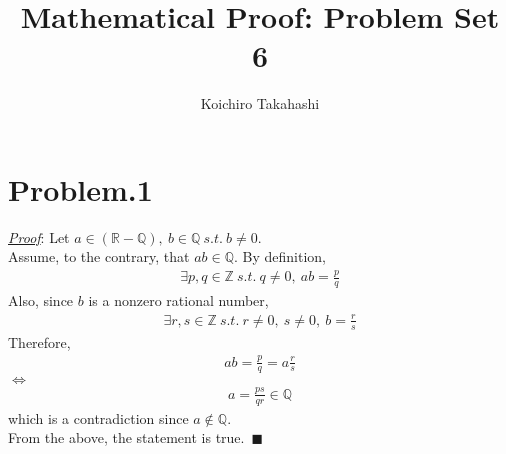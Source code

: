 \documentclass[12pt]{article}
\begin{document}
\title{Mathematical Proof: Problem Set 6}
\author{Koichiro Takahashi}
\maketitle 

\section*{Problem.1}
\underline{\textit{Proof}}: Let $a \in \mathbb{(R-Q)},~ b \in \mathbb{Q} ~s.t.~ b \neq 0$.\\[1em]
Assume, to the contrary, that $ab \in \mathbb{Q}$. By definition,
\begin{gather*}
\exists p, q \in \mathbb{Z} ~s.t.~ q \neq 0,~ab = \frac{p}{q}
\end{gather*}
Also, since $b$ is a nonzero rational number,
\begin{gather*}
\exists r, s \in \mathbb{Z} ~s.t.~ r \neq 0,~s \neq 0,~b = \frac{r}{s}
\end{gather*}
Therefore,
\begin{gather*}
ab = \frac{p}{q} = a \frac{r}{s}
\end{gather*}
$\Leftrightarrow$
\begin{gather*}
a = \frac{p s}{q r} \in \mathbb{Q}
\end{gather*}
which is a contradiction since $a \notin \mathbb{Q}$.\\[1em]
From the above, the statement is true.~$\blacksquare$
\end{document}
